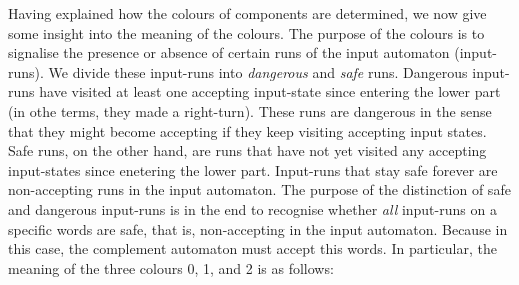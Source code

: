 
Having explained how the colours of components are determined, we now give some insight into the meaning of the colours. The purpose of the colours is to signalise the presence or absence of certain runs of the input automaton (input-runs). We divide these input-runs into \textit{dangerous} and \textit{safe} runs. Dangerous input-runs have visited at least one accepting input-state since entering the lower part (in othe terms, they made a right-turn). These runs are dangerous in the sense that they might become accepting if they keep visiting accepting input states. Safe runs, on the other hand, are runs that have not yet visited any accepting input-states since enetering the lower part. Input-runs that stay safe forever are non-accepting runs in the input automaton. The purpose of the distinction of safe and dangerous input-runs is in the end to recognise whether \textit{all} input-runs on a specific words are safe, that is, non-accepting in the input automaton. Because in this case, the complement automaton must accept this words. In particular, the meaning of the three colours 0, 1, and 2 is as follows:


